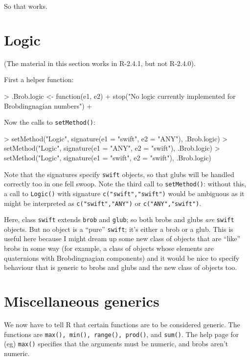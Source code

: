 \documentclass[a4paper]{article}
\begin{document}
So that works.

\section{Logic}
\label{logicSection}


(The material in this section works in R-2.4.1, but not R-2.4.0).

First a helper function:

\begin{Schunk}
\begin{Sinput}
> .Brob.logic <- function(e1, e2) {
+     stop("No logic currently implemented for Brobdingnagian numbers")
+ }
\end{Sinput}
\end{Schunk}


Now the calls to {\tt setMethod()}:


\begin{Schunk}
\begin{Sinput}
> setMethod("Logic", signature(e1 = "swift", e2 = "ANY"), .Brob.logic)
> setMethod("Logic", signature(e1 = "ANY", e2 = "swift"), .Brob.logic)
> setMethod("Logic", signature(e1 = "swift", e2 = "swift"), .Brob.logic)
\end{Sinput}
\end{Schunk}

Note that the signatures specify {\tt swift} objects, so that glubs
will be handled correctly too in one fell swoop. Note the third call
to {\tt setMethod()}: without this, a call to {\tt Logic()} with
signature {\tt c("swift","swift")} would be ambiguous as it might be
interpreted as {\tt c("swift","ANY")} or {\tt c("ANY","swift")}.

Here, class {\tt swift} extends {\tt brob} and {\tt glub}; so both
brobs and glubs {\em are} {\tt swift} objects.  But no object is a
``pure'' {\tt swift}; it's either a brob or a glub.  This is useful
here because I might dream up some new class of objects that are
``like'' brobs in some way (for example, a class of objects whose
elements are quaternions with Brobdingnagian components) and it would
be nice to specify behaviour that is generic to brobs and glubs and
the new class of objects too.




\section{Miscellaneous generics}

We now have to tell R that certain functions are to be considered
generic.  The functions are {\tt max(), min(), range(), prod()}, and
{\tt sum()}.  The help page for (eg) {\tt max()} specifies that the
arguments must be numeric, and brobs aren't numeric.
\end{document}
